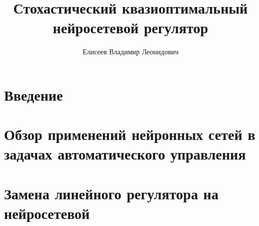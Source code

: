 \documentclass[12pt]{rusthesis}
\title{Стохастический квазиоптимальный нейросетевой регулятор}
\author{Елисеев Владимир Леонидович}
\begin{document}

\setcounter{tocdepth}{3}\tableofcontents

\chapter*{Введение}

%

\chapter{Обзор применений нейронных сетей в задачах автоматического управления}



\chapter{Замена линейного регулятора на нейросетевой}
%
\end{document}
